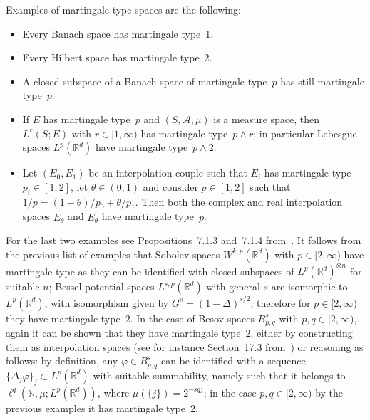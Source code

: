 \documentclass[10pt]{article}
\begin{document}
Examples of martingale type spaces are the following:
\begin{itemize}
  \item Every Banach space has martingale type~1.
  
  \item Every Hilbert space has martingale type~2.
  
  \item A closed subspace of a Banach space of martingale type~$p$ has still
  martingale type~$p$.
  
  \item If $E$ has martingale type~$p$ and $(S, \mathcal{A}, \mu)$ is a
  measure space, then $L^r (S ; E)$ with $r \in [1, \infty)$ has martingale
  type~$p \wedge r$; in particular Lebesgue spaces $L^p (\mathbb{R}^d)$ have
  martingale type~$p \wedge 2$.
  
  \item Let $(E_0, E_1)$ be an interpolation couple such that $E_i$ has
  martingale type~$p_i \in [1, 2]$, let $\theta \in (0, 1)$ and consider $p
  \in [1, 2]$ such that $1 / p = (1 - \theta) / p_0 + \theta / p_1$. Then both
  the complex and real interpolation spaces $E_{\theta}$ and
  $\tilde{E}_{\theta}$ have martingale type~$p$.
\end{itemize}
For the last two examples see Propositions~7.1.3 and~7.1.4
from~{\cite{hytonen}}. It follows from the previous list of examples that
Sobolev spaces $W^{k, p} (\mathbb{R}^d)$ with $p \in [2, \infty)$ have
martingale type as they can be identified with closed subspaces of $L^p
(\mathbb{R}^d)^{\otimes n}$ for suitable $n$; Bessel potential spaces $L^{s,
p} (\mathbb{R}^d)$ with general $s$ are isomorphic to $L^p (\mathbb{R}^d)$,
with isomorphism given by $G^s = (1 - \Delta)^{s / 2}$, therefore for $p \in
[2, \infty)$ they have martingale type~2. In the case of Besov spaces $B^s_{p,
q}$ with $p, q \in [2, \infty)$, again it can be shown that they have
martingale type~2, either by constructing them as interpolation spaces (see
for instance Section~17.3 from~{\cite{leoni}}) or reasoning as follows: by
definition, any $\varphi \in B^s_{p, q}$ can be identified with a sequence $\{
\Delta_j \varphi \}_j \subset L^p (\mathbb{R}^d)$ with suitable summability,
namely such that it belongs to $\ell^q (\mathbb{N}, \mu ; L^p
(\mathbb{R}^d))$, where $\mu (\{ j \}) = 2^{- s q j}$; in the case $p, q \in
[2, \infty)$ by the previous examples it has martingale type~2.

\
\end{document}
